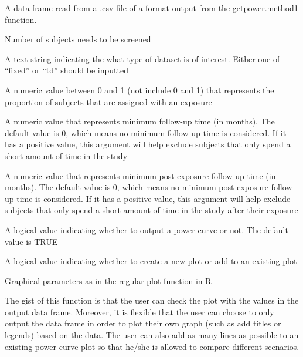 \documentclass[a4paper]{book}
\begin{document}
\begin{Arguments}
\begin{ldescription}
\item[\code{table\_df}] A data frame read from a .csv file of a format output from the
getpower.method1 function.

\item[\code{N}] 
Number of subjects needs to be screened

\item[\code{type}] 
A text string indicating the what type of dataset is of interest.   Either one of
“fixed” or “td” should be inputted

\item[\code{exp.prop}] 
A numeric value between 0 and 1 (not include 0 and 1) that
represents the proportion of subjects that are assigned with an exposure

\item[\code{min.futime}] 
A numeric value that represents minimum follow-up time (in
months). The default value is 0, which means no minimum
follow-up time is considered. If it has a positive value, this argument will help exclude subjects that only spend a short amount of time in the study

\item[\code{min.postexp.futime}] 
A numeric value that represents minimum post-exposure
follow-up time (in months). The default value is 0, which
means no minimum post-exposure follow-up time is
considered. If it has a positive value, this argument will help
exclude subjects that only spend a short amount of time in
the study after their exposure

\item[\code{plot}] 
A logical value indicating whether to output a power curve or not. The
default value is TRUE

\item[\code{newplot}] 
A logical value indicating whether to create a new plot or add to
an existing plot

\item[\code{col,lty,lwd,pch}] 

Graphical parameters as in the regular plot function in R


\end{ldescription}
\end{Arguments}
%
\begin{Details}\relax

The gist of this function is that the user can check the plot with the values in the output data frame. Moreover, it is flexible that the user can choose to only output the data frame in order to plot their own graph (such as add titles or legends) based on the data. The user can also add as many lines as possible to an existing power curve plot so that he/she is allowed to compare different scenarios.
\end{Details}
\end{document}
